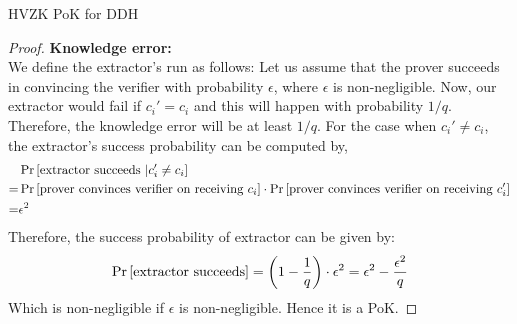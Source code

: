 \begin{solution}{HVZK PoK for DDH}
\begin{proof}
\newpage
    \textbf{Knowledge error:}\\
    We define the extractor's run as follows: 
    Let us assume that the prover succeeds in convincing the verifier with probability $\epsilon$, where $\epsilon$ is non-negligible. Now, our extractor would fail if $c_i' = c_i$ and this will happen with probability $1/q$. Therefore, the knowledge error will be at least $1/q$. For the case when $c_i' \neq c_i$, the extractor's success probability can be computed by,
    \begin{equation}
        \begin{split}
            &\Pr\left[ \text{extractor succeeds }| c_i' \neq c_i \right]\\
            = &\Pr\left[ \text{prover convinces verifier on receiving }c_i \right]\cdot\Pr\left[ \text{prover convinces verifier on receiving }c_i' \right]\\
            = &\epsilon^2
        \end{split}
    \end{equation}
    Therefore, the success probability of extractor can be given by:
    \begin{equation}
        \Pr\left[ \text{extractor succeeds} \right] = \left(1 - \frac{1}{q}\right)\cdot\epsilon^2 = \epsilon^2 - \frac{\epsilon^2}{q}
    \end{equation}
    Which is non-negligible if $\epsilon$ is non-negligible. Hence it is a PoK.


\end{proof}
\end{solution}

